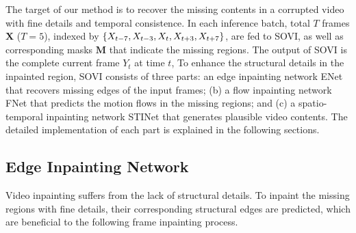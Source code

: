 The target of our method is to recover the missing contents in a corrupted video with fine details and temporal consistence.
%
In each inference batch, total $T$ frames $\boldsymbol{X}$ ($T=5$), indexed by $\{X_{t-7},X_{t-3},X_{t},X_{t+3},X_{t+7}\}$, are fed to SOVI, as well as corresponding masks $\boldsymbol{M}$ that indicate the missing regions.
The output of SOVI is the complete current frame \(Y_t\) at time $t$, 
%
To enhance the structural details in the inpainted region, SOVI consists of three parts: an edge inpainting network ENet that recovers missing edges of the input frames; (b) a flow inpainting network FNet that predicts the motion flows in the missing regions; and (c) a spatio-temporal inpainting network STINet that generates plausible video contents.%
The detailed implementation of each part is explained in the following sections.
 



\subsection{Edge Inpainting Network}
\label{sec:edgenet}

Video inpainting suffers from the lack of structural details.
To inpaint the missing regions with fine details, their corresponding structural edges are predicted, which are beneficial to the following frame inpainting process.%
%

